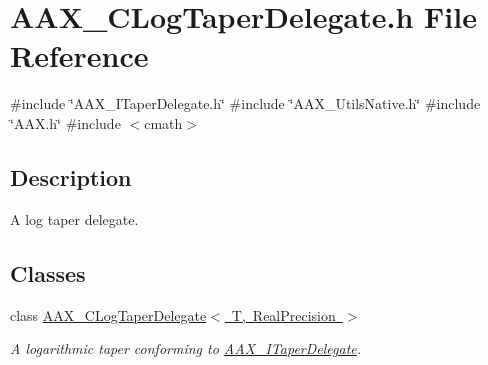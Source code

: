\hypertarget{a00440}{}\section{A\+A\+X\+\_\+\+C\+Log\+Taper\+Delegate.\+h File Reference}
\label{a00440}
{\ttfamily \#include \char`\"{}A\+A\+X\+\_\+\+I\+Taper\+Delegate.\+h\char`\"{}}\newline
{\ttfamily \#include \char`\"{}A\+A\+X\+\_\+\+Utils\+Native.\+h\char`\"{}}\newline
{\ttfamily \#include \char`\"{}A\+A\+X.\+h\char`\"{}}\newline
{\ttfamily \#include $<$cmath$>$}\newline


\subsection{Description}
A log taper delegate. 

\subsection*{Classes}
\begin{DoxyCompactItemize}
\item 
class \mbox{\hyperlink{a01497}{A\+A\+X\+\_\+\+C\+Log\+Taper\+Delegate$<$ T, Real\+Precision $>$}}
\begin{DoxyCompactList}\small\item\em A logarithmic taper conforming to \mbox{\hyperlink{a01881}{A\+A\+X\+\_\+\+I\+Taper\+Delegate}}. \end{DoxyCompactList}\end{DoxyCompactItemize}

